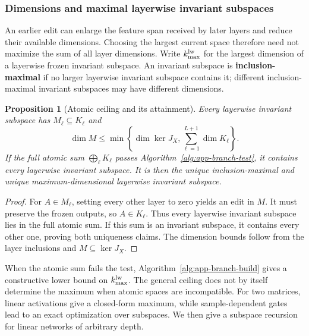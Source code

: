 \documentclass[twoside]{article}
\newtheorem{proposition}[theorem]{Proposition}
\theoremstyle{remark}
\theoremstyle{highlightdefinition}
\theoremstyle{remark}
\begin{document}
\subsubsection{Dimensions and maximal layerwise invariant subspaces}
\label{app:deep-linear}\label{app:sample-gates}
An earlier edit can enlarge the feature span received by later layers and reduce their available dimensions. Choosing the largest current space therefore need not maximize the sum of all layer dimensions. Write $k_{\max}^{\rm lw}$ for the largest dimension of a layerwise frozen invariant subspace. An invariant subspace is \textbf{inclusion-maximal} if no larger layerwise invariant subspace contains it; different inclusion-maximal invariant subspaces may have different dimensions.

\begin{proposition}[Atomic ceiling and its attainment]\label{prop:app-atomic-ceiling}
Every layerwise invariant subspace has $M_\ell\subseteq K_\ell$ and
\[
 \dim M\le\min\left\{\dim\ker J_X,\sum_{\ell=1}^{L+1}\dim K_\ell\right\}.
\]
If the full atomic sum $\bigoplus_\ell K_\ell$ passes Algorithm~\ref{alg:app-branch-test}, it contains every layerwise invariant subspace. It is then the unique inclusion-maximal and unique maximum-dimensional layerwise invariant subspace.
\end{proposition}
\begin{proof}
For $A\in M_\ell$, setting every other layer to zero yields an edit in $M$. It must preserve the frozen outputs, so $A\in K_\ell$. Thus every layerwise invariant subspace lies in the full atomic sum. If this sum is an invariant subspace, it contains every other one, proving both uniqueness claims. The dimension bounds follow from the layer inclusions and $M\subseteq\ker J_X$.
\end{proof}
When the atomic sum fails the test, Algorithm~\ref{alg:app-branch-build} gives a constructive lower bound on $k_{\max}^{\rm lw}$. The general ceiling does not by itself determine the maximum when atomic spaces are incompatible. For two matrices, linear activations give a closed-form maximum, while sample-dependent gates lead to an exact optimization over subspaces. We then give a subspace recursion for linear networks of arbitrary depth.
\end{document}
